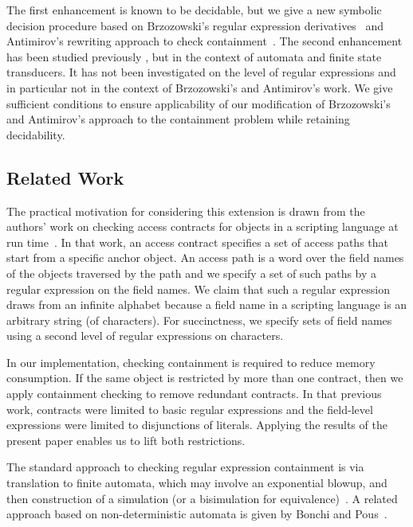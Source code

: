 The first enhancement is known to be decidable, but we give a new
symbolic decision procedure based on Brzozowski's regular expression
derivatives~\cite{Brzozowski1964} and Antimirov's rewriting approach
to check containment~\cite{Antimirov1995}. The
second enhancement has been studied previously \cite{Watson1996,vanNoordGerdemann2001,Veanes2013}, but 
in the context of automata and finite state transducers. It has not been investigated on the level
of regular expressions and in particular not in the context of Brzozowski's and Antimirov's work. We
give sufficient conditions to ensure applicability of our modification of Brzozowski's and
Antimirov's approach to the containment problem while retaining decidability.



\label{sec:related_work}
\subsection{Related Work}

The practical motivation for considering this extension is drawn from
the authors' work on checking access contracts for objects in a scripting language at run 
time~\cite{KeilThiemann2013-Proxy}. In that work, an access contract specifies a set of access paths
that start from a specific anchor object. An access path is a word over the field names of the
objects traversed by the path and we specify a set of such paths by a regular expression on the
field names. We claim that such a regular expression draws from an infinite alphabet because a field
name in a scripting language is an arbitrary string (of characters). For succinctness, we specify
sets of field names using a second level of regular expressions on characters.

In our implementation, checking containment is required to reduce memory consumption.
If the same object is restricted by more than one contract, 
then we apply containment checking to remove
redundant contracts. In that previous work, contracts were limited to
basic regular expressions and the field-level expressions were limited
to disjunctions of literals. Applying the results of the present paper
enables us to lift both restrictions.

The standard approach to checking regular expression containment is
via translation to finite automata, which may involve an exponential
blowup, and then construction of a simulation (or a bisimulation for
equivalence)~\cite{HopcroftKarp1971}. A related approach based on
non-deterministic automata is given
by Bonchi and Pous~\cite{BonchiPous2013}.

